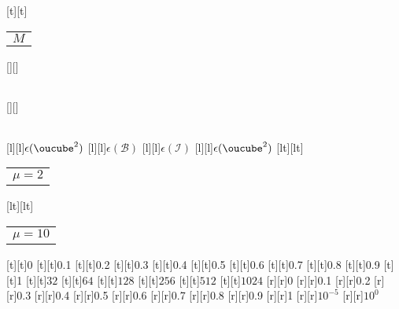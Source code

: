 %    
%
%
\begin{psfrags}%
\psfragscanon%
%
[t][t]{\color[rgb]{0,0,0}\setlength{\tabcolsep}{0pt}\begin{tabular}{c}$M$\end{tabular}}%
[][]{\color[rgb]{0,0,0}\setlength{\tabcolsep}{0pt}\begin{tabular}{c}\end{tabular}}%
[][]{\color[rgb]{0,0,0}\setlength{\tabcolsep}{0pt}\begin{tabular}{c}\end{tabular}}%
[l][l]{\color[rgb]{0,0,0}$\epsilon(\oucube^2)$}%
[l][l]{\color[rgb]{0,0,0}$\epsilon(\mathcal{B})$}%
[l][l]{\color[rgb]{0,0,0}$\epsilon(\mathcal{I})$}%
[l][l]{\color[rgb]{0,0,0}$\epsilon(\oucube^2)$}%
[lt][lt]{\color[rgb]{0,0,0}\setlength{\tabcolsep}{-10pt}\begin{tabular}{l}$\mu=2$\end{tabular}}%
[lt][lt]{\color[rgb]{0,0,0}\setlength{\tabcolsep}{-10pt}\begin{tabular}{l}$\mu=10$\end{tabular}}%
%
[t][t]{0}%
[t][t]{0.1}%
[t][t]{0.2}%
[t][t]{0.3}%
[t][t]{0.4}%
[t][t]{0.5}%
[t][t]{0.6}%
[t][t]{0.7}%
[t][t]{0.8}%
[t][t]{0.9}%
[t][t]{1}%
[t][t]{$32$}%
[t][t]{$64$}%
[t][t]{$128$}%
[t][t]{$256$}%
[t][t]{$512$}%
[t][t]{$1024$}%
%
[r][r]{0}%
[r][r]{0.1}%
[r][r]{0.2}%
[r][r]{0.3}%
[r][r]{0.4}%
[r][r]{0.5}%
[r][r]{0.6}%
[r][r]{0.7}%
[r][r]{0.8}%
[r][r]{0.9}%
[r][r]{1}%
[r][r]{$10^{-5}$}%
[r][r]{$10^{0}$}%
%
%
\end{psfrags}%
%
